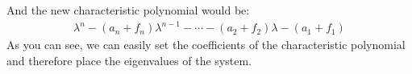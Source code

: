 And the new characteristic polynomial would be:
\begin{align*}
    \lambda^n - (a_n + f_n)\lambda^{n - 1} - \cdots - (a_2 + f_2) \lambda - (a_1 + f_1)
\end{align*}
As you can see, we can easily set the coefficients of the characteristic polynomial and therefore place the eigenvalues of the system. \\
\newline
